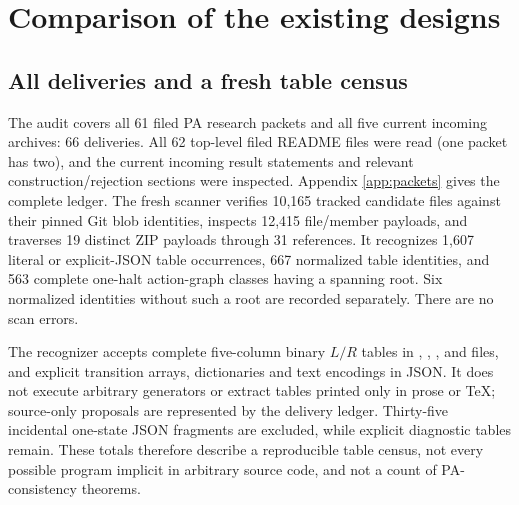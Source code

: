 \section{Comparison of the existing designs}
\label{sec:comparison}

\subsection{All deliveries and a fresh table census}

The audit covers all 61 filed PA research packets and all five current
incoming archives: 66 deliveries. All 62 top-level filed README files
were read (one packet has two), and the current incoming result statements
and relevant construction/rejection sections were inspected. Appendix
\ref{app:packets} gives the complete ledger. The fresh scanner verifies
10,165 tracked candidate files against their pinned Git blob identities,
inspects 12,415 file/member payloads, and traverses 19 distinct ZIP payloads
through 31 references. It recognizes 1,607 literal or explicit-JSON table
occurrences, 667 normalized table identities, and 563 complete one-halt
action-graph classes having a spanning root. Six normalized identities
without such a root are recorded separately. There are no scan errors.

The recognizer accepts complete five-column binary $L/R$ tables in
, , , and  files, and explicit
transition arrays, dictionaries and text encodings in JSON. It does not
execute arbitrary generators or extract tables printed only in prose or
TeX; source-only proposals are represented by the delivery ledger.
Thirty-five incidental one-state JSON fragments are excluded, while
explicit  diagnostic tables remain. These totals therefore
describe a reproducible table census, not every possible program implicit
in arbitrary source code, and not a count of PA-consistency theorems.

